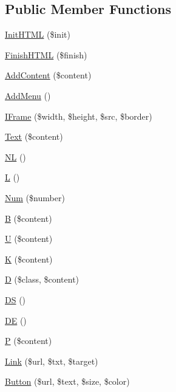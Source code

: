 \subsection*{Public Member Functions}
\begin{DoxyCompactItemize}
\item 
\hyperlink{class_h_t_m_l_element_ac197ac8a1494f06f80566cdb976c84f2}{Init\-H\-T\-M\-L} (\$init)
\item 
\hyperlink{class_h_t_m_l_element_abe647c0d9260043b30261004c312a677}{Finish\-H\-T\-M\-L} (\$finish)
\item 
\hyperlink{class_h_t_m_l_element_a7fd6d1b0467b34de443953e2be12f13a}{Add\-Content} (\$content)
\item 
\hyperlink{class_h_t_m_l_element_ab6b3c0bcc63179b23cc42c901110a16c}{Add\-Menu} ()
\item 
\hyperlink{class_h_t_m_l_element_a29554ae71b8e59155b7d577904748cea}{I\-Frame} (\$width, \$height, \$src, \$border)
\item 
\hyperlink{class_h_t_m_l_element_a989f4d003ff6317129d4eb0785ef32b4}{Text} (\$content)
\item 
\hyperlink{class_h_t_m_l_element_a88a8152792e2d728d1d0f6a1cf0ffb8b}{N\-L} ()
\item 
\hyperlink{class_h_t_m_l_element_a44f142bef7f2fbffa8b2b0c210727787}{L} ()
\item 
\hyperlink{class_h_t_m_l_element_a71e3dc5b5a7a630f66df78a8e1ee2cd4}{Num} (\$number)
\item 
\hyperlink{class_h_t_m_l_element_a96876d2da9cddd39d485bae3d2438c6d}{B} (\$content)
\item 
\hyperlink{class_h_t_m_l_element_a6a372849ec36e5db4047f91f73f3c581}{U} (\$content)
\item 
\hyperlink{class_h_t_m_l_element_a19811fe818d034aab7ec65cb9fc7e0f5}{K} (\$content)
\item 
\hyperlink{class_h_t_m_l_element_a62e160c7f8420244190d71a3775daeea}{D} (\$class, \$content)
\item 
\hyperlink{class_h_t_m_l_element_aeae2417aee112aaca26bbbefe0aa7e10}{D\-S} ()
\item 
\hyperlink{class_h_t_m_l_element_a19f7acb2a4b14e17b749eb10c06b75d9}{D\-E} ()
\item 
\hyperlink{class_h_t_m_l_element_abec61a303902458224a1d7a665093034}{P} (\$content)
\item 
\hyperlink{class_h_t_m_l_element_a84707fade07f58f2de68d5d3d28be365}{Link} (\$url, \$txt, \$target)
\item 
\hyperlink{class_h_t_m_l_element_ac636f824becc1ace9d62b83cf6431f11}{Button} (\$url, \$text, \$size, \$color)

\end{DoxyCompactItemize}
